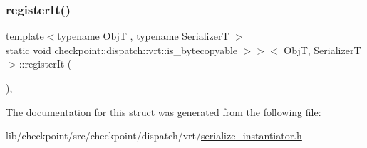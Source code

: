 \subsubsection{\texorpdfstring{register\+It()}{registerIt()}}
{\footnotesize\ttfamily template$<$typename ObjT , typename SerializerT $>$ \\
static void checkpoint\+::dispatch\+::vrt\+::is\+\_\+bytecopyable $>$$>$$<$ ObjT, SerializerT $>$\+::register\+It (\begin{DoxyParamCaption}{ }\end{DoxyParamCaption})\hspace{0.3cm}{\ttfamily [inline]}, {\ttfamily [static]}}



The documentation for this struct was generated from the following file\+:\begin{DoxyCompactItemize}
\item 
lib/checkpoint/src/checkpoint/dispatch/vrt/\hyperlink{serialize__instantiator_8h}{serialize\+\_\+instantiator.\+h}\end{DoxyCompactItemize}

